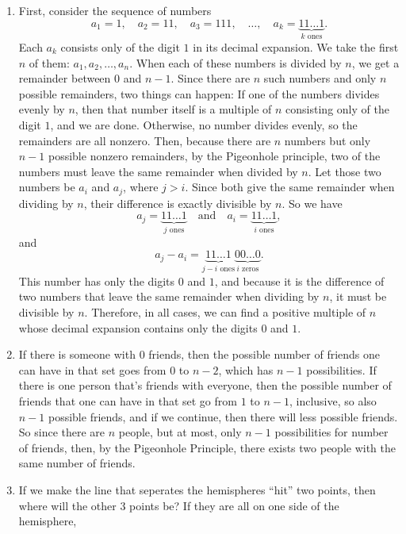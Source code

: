 \documentclass[12pt]{article}
\begin{document}
\begin{enumerate}
    \item First, consider the sequence of numbers 
    \[
    a_1 = 1, \quad a_2 = 11, \quad a_3 = 111, \quad \ldots, \quad a_k = \underbrace{11\ldots1}_{k \text{ ones}}.
    \]
    Each \(a_k\) consists only of the digit \(1\) in its decimal expansion. We take the first \(n\) of them: \(a_1, a_2, \ldots, a_n.\)
    When each of these numbers is divided by \(n\), we get a remainder between \(0\) and \(n-1\). Since there are \(n\) such numbers and only \(n\) possible remainders, two things can happen:
    If one of the numbers divides evenly by \(n\), then that number itself is a multiple of \(n\) consisting only of the digit \(1\), and we are done. 
    Otherwise, no number divides evenly, so the remainders are all nonzero. Then, because there are \(n\) numbers but only \(n-1\) possible nonzero remainders, by the Pigeonhole principle, two of the numbers must leave the same remainder when divided by \(n\). 
    Let those two numbers be \(a_i\) and \(a_j\), where \(j > i\). 
    Since both give the same remainder when dividing by \(n\), their difference is exactly divisible by \(n\). 
    So we have 
    \[
    a_j = \underbrace{11\ldots1}_{j \text{ ones}} \quad \text{and} \quad a_i = \underbrace{11\ldots1}_{i \text{ ones}},
    \]
    and 
    \[
    a_j - a_i = \underbrace{11\ldots1}_{j-i \text{ ones}}\underbrace{00\ldots0}_{i \text{ zeros}}.
    \]
    This number has only the digits \(0\) and \(1\), and because it is the difference of two numbers that leave the same remainder when dividing by \(n\), it must be divisible by \(n\). 
    Therefore, in all cases, we can find a positive multiple of \(n\) whose decimal expansion contains only the digits \(0\) and \(1.\) 
    \item If there is someone with 0 friends, then the possible number of friends one 
    can have in that set goes from $0$ to $n-2$, which has $n-1$ possibilities. 
    If there is one person that's friends with everyone, then the possible 
    number of friends that one can have in that set go from $1$ to $n-1$, inclusive, so also $n-1$ possible 
    friends, and if we continue, then there will less possible friends. So since 
    there are $n$ people, but at most, only $n-1$ possibilities for number of friends, then,
    by the Pigeonhole Principle, there exists two people with the same number of 
    friends.
    \item If we make the line that seperates the hemispheres ``hit'' two points, 
    then where will the other 3 points be? If they are all on one side of the hemisphere, 

\end{enumerate}
\end{document}
